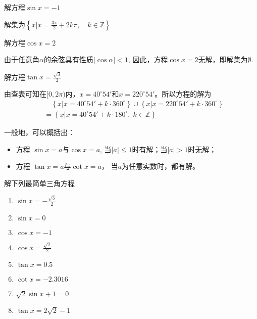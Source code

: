\begin{example}
    解方程$\sin x=-1$
\end{example}

\begin{solution}
    解集为$\left\{x\Big|x=\frac{3\pi}{2}+2k\pi,\quad k\in\mathbb{Z}\right\}$
\end{solution}

\begin{example}
    解方程$\cos x=2$
\end{example}

\begin{solution}
    由于任意角$\alpha$的余弦具有性质$|\cos\alpha|<1$, 因此，方程$\cos x=2$无解，即解集为$\emptyset$.
\end{solution}

\begin{example}
    解方程$\tan x=\frac{\sqrt{3}}{2}$
\end{example}

\begin{solution}
    由查表可知在$[0, 2\pi)$内，$x=40^{\circ}54'$和$x=220^{\circ}54'$。所以方程的解为
\[\begin{split}
   & \quad \left\{x\Big|x=40^{\circ}54'+k\cdot 360^{\circ}\right\} \cup \left\{x\Big|x=220^{\circ}54'+k\cdot 360^{\circ}\right\}\\
   &=\left\{x\Big|x=40^{\circ}54'+k\cdot 180^{\circ},\; k\in\mathbb{Z}\right\}
\end{split}\]
\end{solution}

一般地，可以概括出：
\begin{itemize}
    \item 方程 $\sin x=a$与$\cos x=a$, 当$|a|\le 1$时有解；当$|a|>1$时无解；
    \item 方程 $\tan x=a$与$\cot x=a$， 当$a$为任意实数时，都有解。
\end{itemize}

\begin{ex}
    解下列最简单三角方程
\begin{multicols}{2}
\begin{enumerate}
    \item $\sin x=-\frac{\sqrt{3}}{2}$
    \item $\sin x=0$
    \item $\cos x=-1$
    \item $\cos x=\frac{\sqrt{2}}{2}$
    \item $\tan x=0.5$
    \item $\cot x=-2.3016$
    \item $\sqrt{2}\sin x+1=0$
    \item $\tan x=2\sqrt{2}-1$
\end{enumerate}
\end{multicols}
\end{ex}

